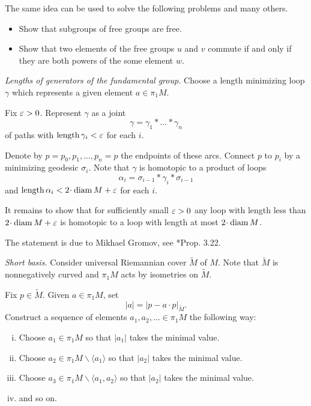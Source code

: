 The same idea can be used to solve the following problems and many others.
\begin{itemize}
\item Show that subgroups of free groups are free.
\item Show that two elements of the free groups $u$ and $v$ commute 
if and only if they are both powers of
the some element $w$.
\end{itemize}



\textit{Lengths of generators of the fundamental group.}
Choose a length minimizing loop $\gamma$ 
which represents a given element $a\in\pi_1M$.

Fix $\varepsilon>0$.
Represent $\gamma$ 
as a joint 
\[\gamma=\gamma_1{*}\dots{*}\gamma_n\]
of paths with $\operatorname{\rm length}\gamma_i<\varepsilon$ for each $i$.
 
Denote by $p=p_0,p_1,\dots, p_n=p$ the endpoints of these arcs.
Connect $p$ to $p_i$ by a minimizing geodesic $\sigma_i$.
Note that $\gamma$ is homotopic to a product of loops
\[\alpha_i=\sigma_{i-1}{*}\gamma_i{*}\sigma_{i-1}\]
and $\length \alpha_i<2\cdot\diam M+\eps$ for each $i$.

It remains to show that for sufficiently small $\varepsilon>0$
any loop with length less than $2\cdot\diam M+\eps$ 
is homotopic to a loop with length at most $2\cdot\diam M$.

 The statement is due to 
Mikhael Gromov, 
see \cite{gromov-MetStr}*{Prop. 3.22}.

\textit{Short basis.}
Consider universal Riemannian cover $\tilde M$ of $M$.
Note that $\tilde M$ is nonnegatively curved and
$\pi_1M$ acts by isometries on $\tilde M$.

Fix $p\in \tilde M$.
Given  $a\in \pi_1M$,
set 
\[|a|=|p- a\cdot p|_{\tilde M}.\]
Construct a sequence of elements $a_1,a_2,\dots\in \pi_1M$ the following way:
\begin{enumerate}[(i)]
\item Choose $a_1\in\pi_1M$ so that $|a_1|$ takes the minimal value.
\item Choose $a_2\in\pi_1M\backslash\langle a_1 \rangle$ so that $|a_2|$ takes the minimal value.
\item Choose $a_3\in\pi_1M\backslash\langle a_1,a_2 \rangle$ so that $|a_2|$ takes the minimal value.
\item and so on.
\end{enumerate}

